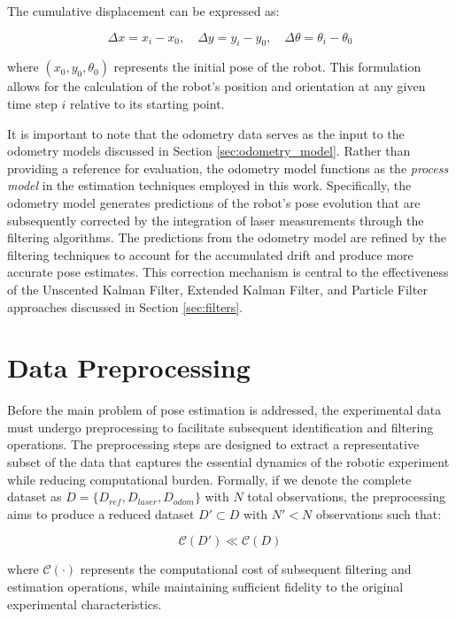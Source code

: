 \documentclass[conference]{IEEEtran}
\begin{document}
The cumulative displacement can be expressed as:

\[
\Delta x = x_i - x_0, \quad \Delta y = y_i - y_0, \quad \Delta \theta = \theta_i - \theta_0
\]

where \( (x_0, y_0, \theta_0) \) represents the initial pose of the robot. This formulation allows for the calculation of the robot's position and orientation at any given time step \( i \) relative to its starting point.

It is important to note that the odometry data serves as the input to the odometry models discussed in Section \ref{sec:odometry_model}. Rather than providing a reference for evaluation, the odometry model functions as the \textit{process model} \cite{Aguirre2007} in the estimation techniques employed in this work. Specifically, the odometry model generates predictions of the robot's pose evolution that are subsequently corrected by the integration of laser measurements through the filtering algorithms. The predictions from the odometry model are refined by the filtering techniques to account for the accumulated drift and produce more accurate pose estimates. This correction mechanism is central to the effectiveness of the Unscented Kalman Filter, Extended Kalman Filter, and Particle Filter approaches discussed in Section \ref{sec:filters}.

\section{Data Preprocessing} \label{sec:data_preprocessing}

Before the main problem of pose estimation is addressed, the experimental data must undergo preprocessing to facilitate subsequent identification and filtering operations. The preprocessing steps are designed to extract a representative subset of the data that captures the essential dynamics of the robotic experiment while reducing computational burden. Formally, if we denote the complete dataset as $D = \{D_{ref}, D_{laser}, D_{odom}\}$ with $N$ total observations, the preprocessing aims to produce a reduced dataset $D' \subset D$ with $N' < N$ observations such that:

\begin{equation}
    \mathcal{C}(D') \ll \mathcal{C}(D)
\end{equation}

where $\mathcal{C}(\cdot)$ represents the computational cost of subsequent filtering and estimation operations, while maintaining sufficient fidelity to the original experimental characteristics.
\end{document}
